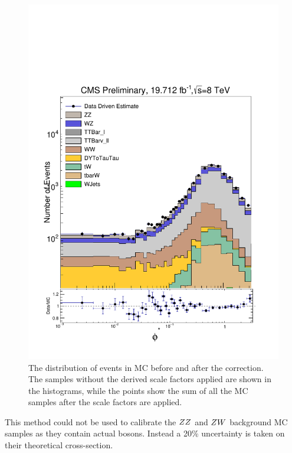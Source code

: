 \begin{figure}[!htbp]
    \centering
    \includegraphics[width=\textwidth]{figures/emu_check.pdf}
    \caption[
        The \phistar distribution of \Ztomumu events in MC before and after the
        \emu correction.
    ]{
        The \phistar distribution of \Ztomumu events in MC before and after the
        \emu correction. The samples without the \emu derived scale factors
        applied are shown in the histograms, while the points show the sum of
        all the MC samples after the scale factors are applied.
    }
    \label{fig:emu_after_correction}
\end{figure}

This method could not be used to calibrate the $ZZ$ and $ZW$ background MC
samples as they contain actual \Z bosons. Instead a 20\% uncertainty is taken
on their theoretical cross-section.

